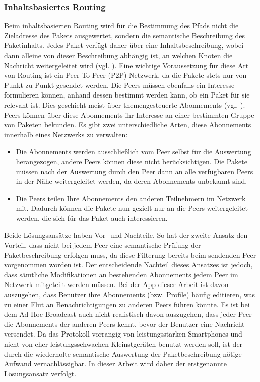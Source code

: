 \subsubsection{Inhaltsbasiertes Routing}
Beim inhaltsbasierten Routing wird für die Bestimmung des Pfads nicht die Zieladresse des Pakets ausgewertet, sondern die semantische Beschreibung des Paketinhalts. Jedes Paket verfügt daher über eine Inhaltsbeschreibung, wobei dann alleine von dieser Beschreibung abhängig ist, an welchen Knoten die Nachricht weitergeleitet wird (vgl. \citet[S. 649]{Tanenbaum2007}). Eine wichtige Voraussetzung für diese Art von Routing ist ein Peer-To-Peer (P2P) Netzwerk, da die Pakete stets nur von Punkt zu Punkt gesendet werden. Die Peers müssen ebenfalls ein Interesse formulieren können, anhand dessen bestimmt werden kann, ob ein Paket für sie relevant ist. Dies geschieht meist über themengesteuerte Abonnements (vgl. \citet[S. 650f]{Tanenbaum2007}). Peers können über diese Abonnements ihr Interesse an einer bestimmten Gruppe von Paketen bekunden. Es gibt zwei unterschiedliche Arten, diese Abonnements innerhalb eines Netzwerks zu verwalten:
\begin{itemize}
	\item Die Abonnements werden ausschließlich vom Peer selbst für die Auswertung herangezogen, andere Peers können diese nicht berücksichtigen. Die Pakete müssen nach der Auswertung durch den Peer dann an alle verfügbaren Peers in der Nähe weitergeleitet werden, da deren Abonnements unbekannt sind. 
	\item Die Peers teilen Ihre Abonnements den anderen Teilnehmern im Netzwerk mit. Dadurch können die Pakete nun gezielt nur an die Peers weitergeleitet werden, die sich für das Paket auch interessieren.
\end{itemize}
Beide Lösungsansätze haben Vor- und Nachteile. So hat der zweite Ansatz den Vorteil, dass nicht bei jedem Peer eine semantische Prüfung der Paketbeschreibung erfolgen muss, da diese Filterung bereits beim sendenden Peer vorgenommen worden ist. Der entscheidende Nachteil dieses Ansatzes ist jedoch, dass sämtliche Modifikationen an bestehenden Abonnements jedem Peer im Netzwerk mitgeteilt werden müssen. Bei der App dieser Arbeit ist davon auszugehen, dass Benutzer ihre Abonnements (bzw. Profile) häufig editieren, was zu einer Flut an Benachrichtigungen zu anderen Peers führen könnte. Es ist bei dem Ad-Hoc Broadcast auch nicht realistisch davon auszugehen, dass jeder Peer die Abonnements der anderen Peers kennt, bevor der Benutzer eine Nachricht versendet. Da das Protokoll vorrangig von leistungsstarken Smartphones und nicht von eher leistungsschwachen Kleinstgeräten benutzt werden soll, ist der durch die wiederholte semantische Auswertung der Paketbeschreibung nötige Aufwand vernachlässigbar. In dieser Arbeit wird daher der erstgenannte Lösungsansatz verfolgt. 
